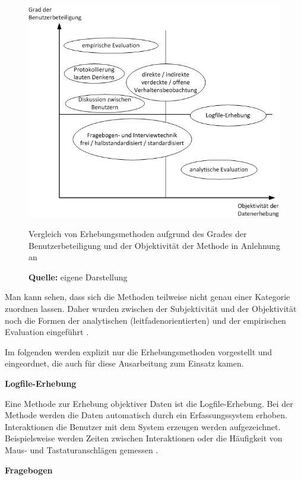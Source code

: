 \begin{figure}[H]
  \centering
  \includegraphics[scale=0.8]{img/Datenerhebungsmethoden_Objektivitaet_Benutzerbeteiligung.png}
  \caption{Vergleich von Erhebungsmethoden aufgrund des Grades der Benutzerbeteiligung und der Objektivität der Methode in Anlehnung an \citep[16]{Hegner2003}}
  \caption*{\textbf{Quelle:} eigene Darstellung}
  \label{fig:erhebungsmethodenObjektivitaetBenutzerbeteiligung}
\end{figure}

Man kann sehen, dass sich die Methoden teilweise nicht genau einer Kategorie zuordnen lassen. Daher wurden zwischen der Subjektivität und der Objektivität noch die Formen der analytischen (leitfadenorientierten) und der empirischen Evaluation eingeführt \citep[vgl.][15]{Hegner2003}.


Im folgenden werden explizit nur die Erhebungsmethoden vorgestellt und eingeordnet, die auch für diese Ausarbeitung zum Einsatz kamen.

\textbf{Logfile-Erhebung}

Eine Methode zur Erhebung objektiver Daten ist die Logfile-Erhebung. Bei der Methode werden die Daten automatisch durch ein Erfassungssystem erhoben. Interaktionen die Benutzer mit dem System erzeugen werden aufgezeichnet. Beispielsweise werden Zeiten zwischen Interaktionen oder die Häufigkeit von Maus- und Tastaturanschlägen gemessen \citep[vgl.][63]{Hegner2003}. 

\textbf{Fragebogen}

